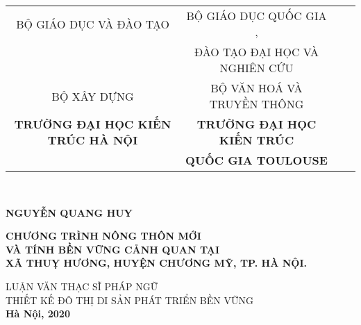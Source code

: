 \documentclass[../thesis.tex]{subfiles}
\begin{document}
\begin{titlepage}

\begin{center}
\begin{table}
\small
\centering
\begin{tabular}{c c r l}
BỘ GIÁO DỤC VÀ ĐÀO TẠO  &  BỘ GIÁO DỤC QUỐC GIA ,\\
 & ĐÀO TẠO ĐẠI HỌC VÀ NGHIÊN CỨU\\ 
BỘ XÂY DỰNG & BỘ VĂN HOÁ VÀ TRUYỀN THÔNG\\
\textbf{TRƯỜNG ĐẠI HỌC KIẾN TRÚC HÀ NỘI} & \textbf{TRƯỜNG ĐẠI HỌC KIẾN TRÚC}\\
& \textbf{QUỐC GIA TOULOUSE}
\end{tabular}
\\[2cm]
\end{table}

\textbf{NGUYỄN QUANG HUY\\[2cm]}


\textbf{\large CHƯƠNG TRÌNH NÔNG THÔN MỚI\\ VÀ TÍNH BỀN VỮNG CẢNH QUAN TẠI\\ XÃ THUỴ HƯƠNG, HUYỆN CHƯƠNG MỸ, TP. HÀ NỘI.\\[2cm]}

LUẬN VĂN THẠC SĨ PHÁP NGỮ\\
THIẾT KẾ ĐÔ THỊ DI SẢN PHÁT TRIỂN BỀN VỮNG\\[8cm]


\textbf{Hà Nội, 2020}

\end{center}

\end{titlepage}
\end{document}
